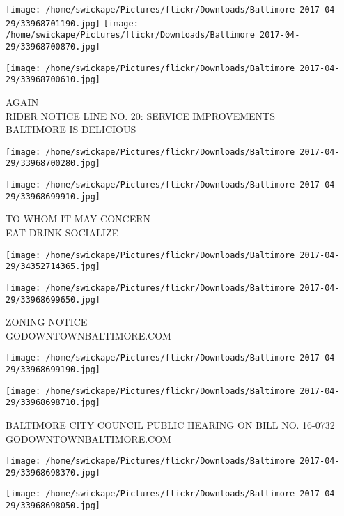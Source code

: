 \documentclass[10pt,letterpaper]{article}
\begin{document}
\texttt{[image: /home/swickape/Pictures/flickr/Downloads/Baltimore 2017-04-29/33968701190.jpg]}
\texttt{[image: /home/swickape/Pictures/flickr/Downloads/Baltimore 2017-04-29/33968700870.jpg]}

\vspace{0.25in}
\texttt{[image: /home/swickape/Pictures/flickr/Downloads/Baltimore 2017-04-29/33968700610.jpg]}

AGAIN\\
RIDER NOTICE LINE NO. 20: SERVICE IMPROVEMENTS\\
BALTIMORE IS DELICIOUS\\
\pagebreak

\texttt{[image: /home/swickape/Pictures/flickr/Downloads/Baltimore 2017-04-29/33968700280.jpg]}

\vspace{0.25in}
\texttt{[image: /home/swickape/Pictures/flickr/Downloads/Baltimore 2017-04-29/33968699910.jpg]}

TO WHOM IT MAY CONCERN\\
EAT DRINK SOCIALIZE\\
\pagebreak

\texttt{[image: /home/swickape/Pictures/flickr/Downloads/Baltimore 2017-04-29/34352714365.jpg]}

\vspace{0.25in}
\texttt{[image: /home/swickape/Pictures/flickr/Downloads/Baltimore 2017-04-29/33968699650.jpg]}

ZONING NOTICE\\
GODOWNTOWNBALTIMORE.COM\\
\pagebreak

\texttt{[image: /home/swickape/Pictures/flickr/Downloads/Baltimore 2017-04-29/33968699190.jpg]}

\vspace{0.25in}
\texttt{[image: /home/swickape/Pictures/flickr/Downloads/Baltimore 2017-04-29/33968698710.jpg]}

BALTIMORE CITY COUNCIL PUBLIC HEARING ON BILL NO. 16{-}0732\\
GODOWNTOWNBALTIMORE.COM\\
\pagebreak

\texttt{[image: /home/swickape/Pictures/flickr/Downloads/Baltimore 2017-04-29/33968698370.jpg]}

\vspace{0.25in}
\texttt{[image: /home/swickape/Pictures/flickr/Downloads/Baltimore 2017-04-29/33968698050.jpg]}
\end{document}
